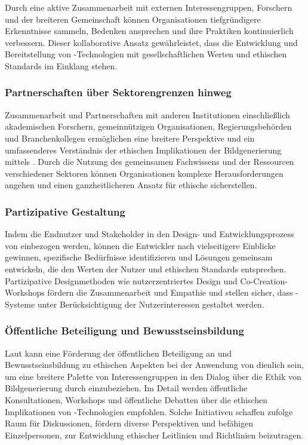 \documentclass[12pt]{report}
\begin{document}
Durch eine aktive Zusammenarbeit mit externen Interessengruppen, Forschern und der breiteren Gemeinschaft können Organisationen tiefgründigere Erkenntnisse sammeln, Bedenken ansprechen und ihre Praktiken kontinuierlich verbessern. Dieser kollaborative Ansatz gewährleistet, dass die Entwicklung und Bereitstellung von  -Technologien mit gesellschaftlichen Werten und ethischen Standards im Einklang stehen.\cite{EUCommision}\cite{UNESCO}

\subsubsection{Partnerschaften über Sektorengrenzen hinweg}
Zusammenarbeit und Partnerschaften mit anderen Institutionen einschließlich akademischen Forschern, gemeinnützigen Organisationen, Regierungsbehörden und Branchenkollegen ermöglichen eine breitere Perspektive und ein umfassenderes Verständnis der ethischen Implikationen der Bildgenerierung mittels . Durch die Nutzung des gemeinsamen Fachwissens und der Ressourcen verschiedener Sektoren können Organisationen komplexe Herausforderungen angehen und einen ganzheitlicheren Ansatz für ethische  sicherstellen.\cite{Vogel}

\subsubsection{Partizipative Gestaltung}
Indem die Endnutzer und Stakeholder in den Design- und Entwicklungsprozess von   einbezogen werden, können die Entwickler nach \cite{Zytko} vielseitigere Einblicke gewinnen, spezifische Bedürfnisse identifizieren und Lösungen gemeinsam entwickeln, die den Werten der Nutzer und ethischen Standards entsprechen. Partizipative Designmethoden wie nutzerzentriertes Design und Co-Creation-Workshops fördern die Zusammenarbeit und Empathie und stellen sicher, dass -Systeme unter Berücksichtigung der Nutzerinteressen gestaltet werden.

\subsubsection{Öffentliche Beteiligung und Bewusstseinsbildung}
Laut \cite{WILSON2022101652} kann eine Förderung der öffentlichen Beteiligung an und Bewusstseinsbildung zu ethischen Aspekten bei der Anwendung von  dienlich sein, um eine breitere Palette von Interessengruppen in den Dialog über die Ethik von Bildgenerierung durch  einzubeziehen. Im Detail werden öffentliche Konsultationen, Workshops und öffentliche Debatten über die ethischen Implikationen von -Technologien empfohlen. Solche Initiativen schaffen \cite{WILSON2022101652} zufolge Raum für Diskussionen, fördern diverse Perspektiven und befähigen Einzelpersonen, zur Entwicklung ethischer Leitlinien und Richtlinien beizutragen.
\end{document}
